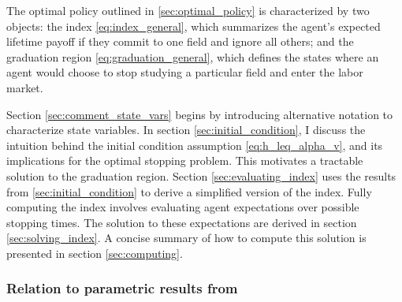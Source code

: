 The optimal policy outlined in \ref{sec:optimal_policy} is characterized by two objects: the index \eqref{eq:index_general}, which summarizes the agent's expected lifetime payoff if they commit to one field and ignore all others; and the graduation region \eqref{eq:graduation_general}, which defines the states where an agent would choose to stop studying a particular field and enter the labor market.

Section \ref{sec:comment_state_vars} begins by introducing alternative notation to characterize state variables.
In section \ref{sec:initial_condition}, I discuss the intuition behind the initial condition assumption \eqref{eq:h_leq_alpha_v}, and its implications for the optimal stopping problem.
This motivates a tractable solution to the graduation region. 
Section \ref{sec:evaluating_index} uses the results from \ref{sec:initial_condition} to derive a simplified version of the index. 
Fully computing the index involves evaluating agent expectations over possible stopping times. 
The solution to these expectations are derived in section \ref{sec:solving_index}.
A concise summary of how to compute this solution is presented in section \ref{sec:computing}.

\subsubsection*{Relation to parametric results from \textcite{AF20}}

